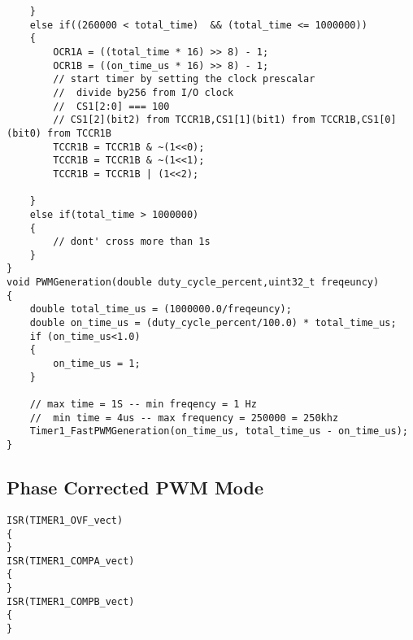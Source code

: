 \begin{verbatim}
	}
	else if((260000 < total_time)  && (total_time <= 1000000))
	{
		OCR1A = ((total_time * 16) >> 8) - 1;
		OCR1B = ((on_time_us * 16) >> 8) - 1;
		// start timer by setting the clock prescalar
		//  divide by256 from I/O clock
		//  CS1[2:0] === 100
		// CS1[2](bit2) from TCCR1B,CS1[1](bit1) from TCCR1B,CS1[0](bit0) from TCCR1B
		TCCR1B = TCCR1B & ~(1<<0);
		TCCR1B = TCCR1B & ~(1<<1);
		TCCR1B = TCCR1B | (1<<2);
		
	}
	else if(total_time > 1000000)
	{
		// dont' cross more than 1s
	}
}
void PWMGeneration(double duty_cycle_percent,uint32_t freqeuncy)
{
	double total_time_us = (1000000.0/freqeuncy);
	double on_time_us = (duty_cycle_percent/100.0) * total_time_us;
	if (on_time_us<1.0)
	{
		on_time_us = 1;
	}
	
	// max time = 1S -- min freqency = 1 Hz
	//  min time = 4us -- max frequency = 250000 = 250khz
	Timer1_FastPWMGeneration(on_time_us, total_time_us - on_time_us);
}
\end{verbatim}


\subsection{Phase Corrected PWM Mode}
\begin{verbatim}
ISR(TIMER1_OVF_vect)
{
} 
ISR(TIMER1_COMPA_vect)
{
}
ISR(TIMER1_COMPB_vect)
{
}
\end{verbatim}

